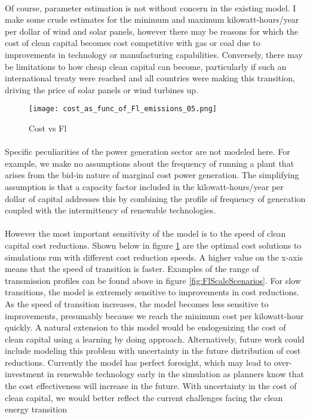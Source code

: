 \documentclass{article}
\begin{document}
\paragraph{} Of course, parameter estimation is not without concern in the existing model. I make some crude estimates for the minimum and maximum kilowatt-hours/year per dollar of wind and solar panels, however there may be reasons for which the cost of clean capital becomes cost competitive with gas or coal due to improvements in technology or manufacturing capabilities. Conversely, there may be limitations to how cheap clean capital can become, particularly if such an international treaty were reached and all countries were making this transition, driving the price of solar panels or wind turbines up. 

\begin{figure}[h]
\texttt{[image: cost\_as\_func\_of\_Fl\_emissions\_05.png]}
\caption{Cost vs Fl\label{fig:costVsFl}}
\end{figure}

\paragraph{} Specific peculiarities of the power generation sector are not modeled here. For example, we make no assumptions about the frequency of running a plant that arises from the bid-in nature of marginal cost power generation. The simplifying assumption is that a capacity factor included in the kilowatt-hours/year per dollar of capital addresses this by combining the profile of frequency of generation coupled with the intermittency of renewable technologies. 


\paragraph{} However the most important sensitivity of the model is to the speed of clean capital cost reductions. Shown below in figure \ref{fig:costVsFl} are the optimal cost solutions to simulations run with different cost reduction speeds. A higher value on the x-axis means that the speed of transition is faster. Examples of the range of transmission profiles can be found above in figure \ref{fig:FlScaleScenarios}. For slow transitions, the model is extremely sensitive to improvements in cost reductions. As the speed of transition increases, the model becomes less sensitive to improvements, presumably because we reach the minimum cost per kilowatt-hour quickly. A natural extension to this model would be endogenizing the cost of clean capital using a learning by doing approach. Alternatively, future work could include modeling this problem with uncertainty in the future distribution of cost reductions. Currently the model has perfect foresight, which may lead to over-investment in renewable technology early in the simulation as planners know that the cost effectiveness will increase in the future. With uncertainty in the cost of clean capital, we would better reflect the current challenges facing the clean energy transition
\end{document}
